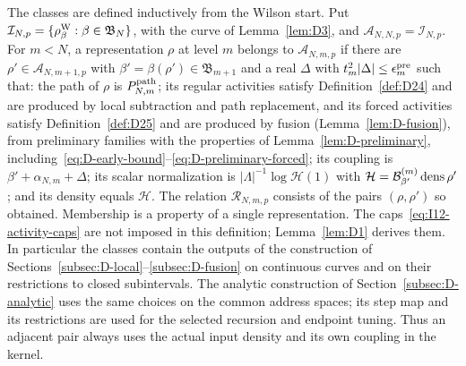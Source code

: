 The classes are defined inductively from the Wilson start. Put $\mathcal I_{N,p}=\{\rho^{\rm W}_\beta:\beta\in\mathfrak B_N\}$, with the curve of Lemma~\ref{lem:D3}, and $\mathcal A_{N,N,p}=\mathcal I_{N,p}$. For $m<N$, a representation $\rho$ at level $m$ belongs to $\mathcal A_{N,m,p}$ if there are $\rho'\in\mathcal A_{N,m+1,p}$ with $\beta'=\beta(\rho')\in\mathfrak B_{m+1}$ and a real $\Delta$ with $t_m^2|\Delta|\le\epsilon^{\rm pre}_m$ such that: the path of $\rho$ is $P^{\mathrm{path}}_{N,m}$; its regular activities satisfy Definition~\ref{def:D24} and are produced by local subtraction and path replacement, and its forced activities satisfy Definition~\ref{def:D25} and are produced by fusion (Lemma~\ref{lem:D-fusion}), from preliminary families with the properties of Lemma~\ref{lem:D-preliminary}, including~\eqref{eq:D-early-bound}--\eqref{eq:D-preliminary-forced}; its coupling is $\beta'+\alpha_{N,m}+\Delta$; its scalar normalization is $|\Lambda|^{-1}\log\mathcal H(1)$ with $\mathcal H=\mathcal{B}^{(m)}_{\beta'}\operatorname{dens}\rho'$; and its density equals $\mathcal H$. The relation $\mathcal R_{N,m,p}$ consists of the pairs $(\rho,\rho')$ so obtained. Membership is a property of a single representation. The caps~\eqref{eq:I12-activity-caps} are not imposed in this definition; Lemma~\ref{lem:D1} derives them. In particular the classes contain the outputs of the construction of Sections~\ref{subsec:D-local}--\ref{subsec:D-fusion} on continuous curves and on their restrictions to closed subintervals. The analytic construction of Section~\ref{subsec:D-analytic} uses the same choices on the common address spaces; its step map and its restrictions are used for the selected recursion and endpoint tuning. Thus an adjacent pair always uses the actual input density and its own coupling in the kernel.

